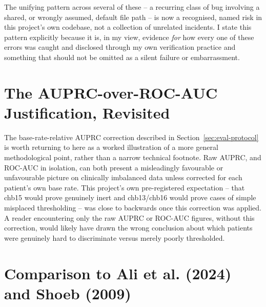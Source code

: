 The unifying pattern across several of these -- a recurring class of bug involving a shared, or wrongly assumed, default file path -- is now a recognised, named risk in this project's 
own codebase, not a collection of unrelated incidents. I state this pattern explicitly because it is, in my view, evidence \emph{for}  
how every one of these errors was caught and disclosed through my own verification practice and something that should not be omitted as a silent failure or embarrassment.

\section{The AUPRC-over-ROC-AUC Justification, Revisited}

The base-rate-relative AUPRC correction described in Section~\ref{sec:eval-protocol} is worth returning to here as a worked illustration of a more general methodological point, rather than a narrow technical footnote. Raw AUPRC, and ROC-AUC in isolation, can both present a misleadingly favourable or unfavourable picture on clinically imbalanced data unless corrected for each patient's own base rate. This project's own pre-registered expectation -- that chb15 would prove genuinely inert and chb13/chb16 would prove cases of simple misplaced thresholding -- was close to backwards once this correction was applied. A reader encountering only the raw AUPRC or ROC-AUC figures, without this correction, would likely have drawn the wrong conclusion about which patients were genuinely hard to discriminate versus merely poorly thresholded.

\section{Comparison to Ali et al. (2024) and Shoeb (2009)}

